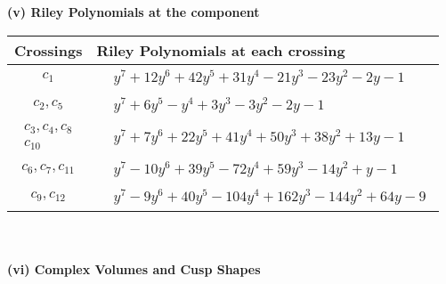 \documentclass[1p]{elsarticle_modified}
\theoremstyle{definition}
\begin{document}
\newpage\renewcommand{\arraystretch}{1}
\flushleft \textbf{(v) Riley Polynomials at the component}\newline \\
\begin{tabular}{m{50pt}|m{274pt}}
Crossings & \hspace{64pt}Riley Polynomials at each crossing \\
\hline $$\begin{aligned}c_{1}\end{aligned}$$&$\begin{aligned}
&y^7+12 y^6+42 y^5+31 y^4-21 y^3-23 y^2-2 y-1
\end{aligned}$\\
\hline $$\begin{aligned}c_{2},c_{5}\end{aligned}$$&$\begin{aligned}
&y^7+6 y^5- y^4+3 y^3-3 y^2-2 y-1
\end{aligned}$\\
\hline $$\begin{aligned}c_{3},c_{4},c_{8}\\c_{10}\end{aligned}$$&$\begin{aligned}
&y^7+7 y^6+22 y^5+41 y^4+50 y^3+38 y^2+13 y-1
\end{aligned}$\\
\hline $$\begin{aligned}c_{6},c_{7},c_{11}\end{aligned}$$&$\begin{aligned}
&y^7-10 y^6+39 y^5-72 y^4+59 y^3-14 y^2+y-1
\end{aligned}$\\
\hline $$\begin{aligned}c_{9},c_{12}\end{aligned}$$&$\begin{aligned}
&y^7-9 y^6+40 y^5-104 y^4+162 y^3-144 y^2+64 y-9
\end{aligned}$\\
\hline
\end{tabular}\\~\\
\newpage\flushleft \textbf{(vi) Complex Volumes and Cusp Shapes}
\end{document}
